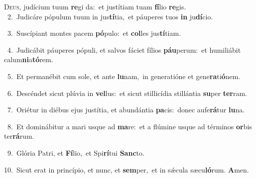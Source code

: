 \lettrine{\initial\textcolor{\initialcolor}{D}}{eus,} judícium tuum \textbf{re}\-gi da:~\star et justítiam tuam \textbf{fí}\-lio \textbf{re}\-gis.\\
{\numbfont\textcolor{\numbcolor}{~2.}}~Judicáre pópulum tuum in jus\-\textbf{tí}\-tia,~\star et páuperes tuos \textbf{in} ju\-\textbf{dí}\-cio.\par
{\numbfont\textcolor{\numbcolor}{~3.}}~Suscípiant montes pacem \textbf{pó}\-pulo:~\star et \textbf{col}\-les jus\-\textbf{tí}\-tiam.\par
{\numbfont\textcolor{\numbcolor}{~4.}}~Judicábit páuperes pópuli, et salvos fáciet fílios \textbf{páu}\-perum:~\star et humiliábit calum\-\textbf{ni}\-a\-\textbf{tó}\-rem.\par
{\numbfont\textcolor{\numbcolor}{~5.}}~Et permanébit cum sole, et ante \textbf{lu}\-nam,~\star in generatióne et gene\-\textbf{ra}\-ti\-\textbf{ó}\-nem.\par
{\numbfont\textcolor{\numbcolor}{~6.}}~Descéndet sicut plúvia in \textbf{vel}\-lus:~\star et sicut stillicídia stillántia \textbf{su}\-per \textbf{ter}\-ram.\par
{\numbfont\textcolor{\numbcolor}{~7.}}~Oriétur in diébus ejus justítia, et abundántia \textbf{pa}\-cis:~\star donec aufe\-\textbf{rá}\-tur \textbf{lu}\-na.\par
{\numbfont\textcolor{\numbcolor}{~8.}}~Et dominábitur a mari usque ad \textbf{ma}\-re:~\star et a flúmine usque ad términos \textbf{or}\-bis ter\-\textbf{rá}\-rum.\par
{\numbfont\textcolor{\numbcolor}{~9.}}~Glória Patri, et \textbf{Fí}\-lio,~\star et Spi\-\textbf{rí}\-tui \textbf{Sanc}\-to.\par
{\numbfont\textcolor{\numbcolor}{10.}}~Sicut erat in princípio, et nunc, et \textbf{sem}\-per,~\star et in sǽcula sæcu\-\textbf{ló}\-rum. \textbf{A}\-men.\par
